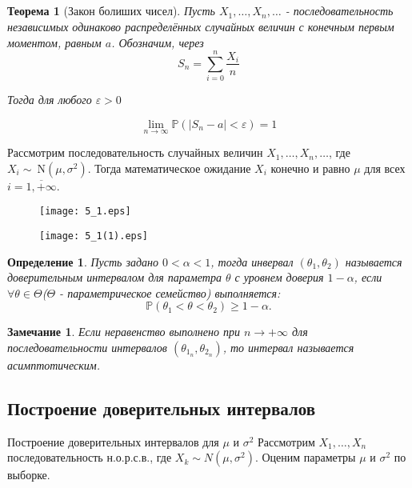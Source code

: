 \documentclass[11pt]{article}
\newtheorem{theorem}{Теорема}[section]
\newtheorem{corollary}{Замечание}[theorem]
\newtheorem{definition}{Определение}[section]
\begin{document}
\subsection{}
\begin{theorem}[Закон болиших чисел]
Пусть $X_1, \ldots, X_n, \ldots$ - последовательность независимых одинаково распределённых случайных величин с конечным первым моментом, равным $a$. Обозначим, через
$$
S_n=\sum_{i=0}^n \frac{X_i}{n}
$$

Тогда для любого $\varepsilon>0$

$$
\lim _{n \rightarrow \infty} \mathbb{P}\left(\left|S_n-a\right|<\varepsilon\right)=1
$$

\end{theorem}

Рассмотрим последовательность случайных величин $X_1, \ldots, X_n, \ldots$, где $X_i \sim \mathrm{~N}\left(\mu, \sigma^2\right)$. Тогда математическое ожидание $X_i$ конечно и равно $\mu$ для всех $i=\overline{1, +\infty}$.
\begin{figure}[ht]
    \texttt{[image: 5\_1.eps]} 
    \caption{}
\end{figure} 
\begin{figure}[ht]
    \texttt{[image: 5\_1(1).eps]} 
    \caption{}
\end{figure} 

\FloatBarrier

\begin{definition}
 Пусть задано $0 < \alpha < 1$, тогда инвервал $(\theta_1, \theta_2)$ называется доверительным интервалом для параметра $\theta$ с уровнем
доверия $1 - \alpha$, если $\forall \theta \in \Theta$($\Theta$ - параметрическое семейство) выполняется:
$$
  \mathbb{P}(\theta_1 < \theta < \theta_2) \geqslant 1 - \alpha.
$$
\end{definition}
\begin{corollary}
 Если неравенство выполнено при $n \to +\infty$
 для последовательности интервалов $(\theta_{1_n}, \theta_{2_n})$, то интервал называется асимптотическим.
\end{corollary}

\subsection{Построение доверительных интервалов}
Построение доверительных интервалов для $\mu$ и $\sigma^2$ Рассмотрим $X_1, \ldots, X_n$ последовательность н.о.р.с.в., где $X_k \sim N\left(\mu, \sigma^2\right)$. Оценим параметры $\mu$ и $\sigma^2$ по выборке.
\end{document}
